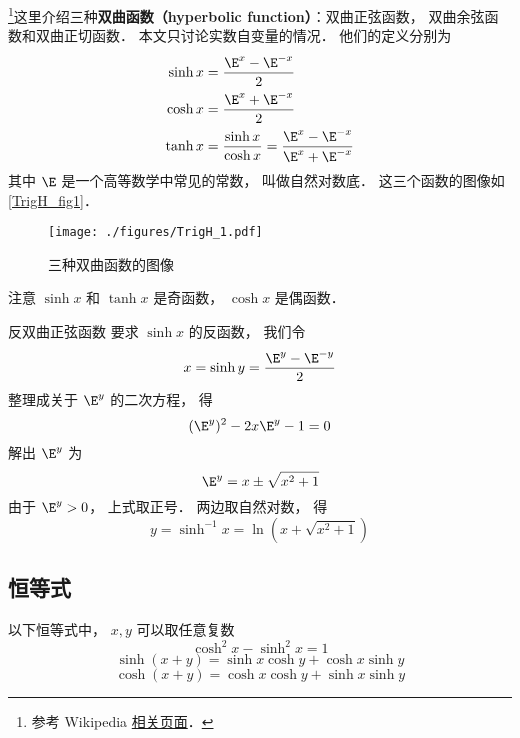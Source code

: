

\footnote{参考 Wikipedia \href{https://en.wikipedia.org/wiki/Hyperbolic_functions}{相关页面}．}这里介绍三种\textbf{双曲函数（hyperbolic function）}：双曲正弦函数， 双曲余弦函数和双曲正切函数． 本文只讨论实数自变量的情况． 他们的定义分别为
\begin{align}
\sinh x &= \frac{\E^x - \E^{-x}}{2}\\
\label{TrigH_eq1}
\cosh x &= \frac{\E^x + \E^{-x}}{2}\\
\tanh x &= \frac{\sinh x}{\cosh x} = \frac{\E^x - \E^{-x}}{\E^x + \E^{-x}}
\end{align}
其中 $\E$ 是一个高等数学中常见的常数， 叫做自然对数底． 这三个函数的图像如\autoref{TrigH_fig1}．

\begin{figure}[ht]
\centering
\texttt{[image: ./figures/TrigH\_1.pdf]}
\caption{三种双曲函数的图像} \label{TrigH_fig1}
\end{figure}

注意 $\sinh x$ 和 $\tanh x$ 是奇函数， $\cosh x$ 是偶函数．

\begin{example}{反双曲正弦函数}\label{TrigH_ex1}
要求 $\sinh x$ 的反函数， 我们令
\begin{equation}
x = \sinh y =  \frac{\E^y - \E^{-y}}{2}
\end{equation}
整理成关于 $\E^y$ 的二次方程， 得
\begin{equation}
(\E^y)^2 - 2x \E^y - 1 = 0
\end{equation}
解出 $\E^y$ 为
\begin{equation}
\E^y = x \pm \sqrt{x^2 + 1}
\end{equation}
由于 $\E^y > 0$， 上式取正号． 两边取自然对数， 得
\begin{equation}
y = \sinh^{-1} x = \ln(x + \sqrt{x^2 + 1})
\end{equation}
\end{example}

\subsection{恒等式}
以下恒等式中， $x,y$ 可以取任意复数
\begin{equation}
\cosh^2 x - \sinh^2 x = 1
\end{equation}
\begin{equation}
\sinh(x+y) = \sinh x \cosh y + \cosh x \sinh y
\end{equation}
\begin{equation}
\cosh(x+y) = \cosh x \cosh y + \sinh x \sinh y
\end{equation}
